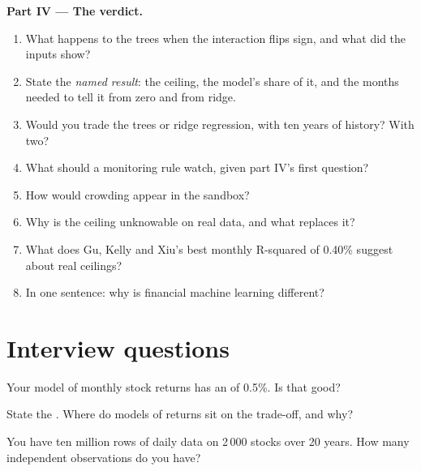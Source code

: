 \begin{problem}
\medskip\noindent\textbf{Part IV --- The verdict.}
\begin{enumerate}[resume]
\item What happens to the trees when the interaction flips sign, and what did the inputs show?
\item State the \emph{named result}: the ceiling, the model's share of it, and the months needed to tell it from zero
and from ridge.
\item Would you trade the trees or ridge regression, with ten years of history? With two?
\item What should a monitoring rule watch, given part IV's first question?
\item How would crowding appear in the sandbox?
\item Why is the ceiling unknowable on real data, and what replaces it?
\item What does Gu, Kelly and Xiu's best monthly R-squared of 0.40\% suggest about real ceilings?
\item In one sentence: why is financial machine learning different?
\end{enumerate}
\end{problem}

\section{Interview questions}

\begin{interviewq}\label{iq:ml:why-financial-machine-learning-is-different:1}
Your model of monthly stock returns has an  of 0.5\%. Is that good?
\end{interviewq}

\begin{interviewq}\label{iq:ml:why-financial-machine-learning-is-different:2}
State the . Where do models of returns sit on the trade-off, and why?
\end{interviewq}

\begin{interviewq}\label{iq:ml:why-financial-machine-learning-is-different:3}
You have ten million rows of daily data on 2\,000 stocks over 20 years. How many independent observations do you have?
\end{interviewq}

